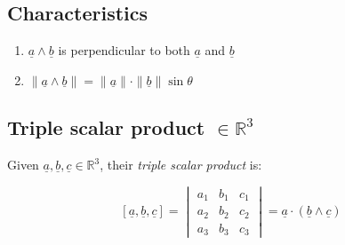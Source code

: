 \documentclass[00_complete]{subfiles}
\begin{document}
\subsection{Characteristics}
\begin{enumerate}
    \item $\underline a \land \underline b$ is perpendicular to both $\underline a$
   and $\underline b$
    \item $\|\underline a \land \underline b\| = \|\underline a\| \cdot
        \|\underline b\| \sin \theta$

\end{enumerate}

\subsection{Triple scalar product \texorpdfstring{$\in \mathbb{R}^3$}{in R3}}

Given $\underline a, \underline b, \underline c \in \mathbb{R}^3$, their
\emph{triple scalar product} is:

$$
[\underline a, \underline b, \underline c] =
\begin{vmatrix}
    a_1 & b_1 & c_1 \\
    a_2 & b_2 & c_2 \\
    a_3 & b_3 & c_3
\end{vmatrix} = \underline a \cdot (\underline b \land \underline c)$$
\end{document}
